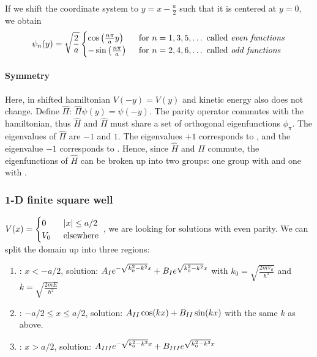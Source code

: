 If we shift the coordinate system to $y = x - \frac{a}{2}$ such that it is centered
at $y=0$, we obtain
\begin{align*}
    \psi_n (y) = \sqrt{\frac{2}{a}} \begin{cases}
        \cos \left(  \frac{n \pi}{a} y \right) \hspace{5pt} &\text{for } n=1,3,5,\dots \text{ called \textit{even functions}}
        \\
        - \sin \left( \frac{n \pi}{a} \right) \hspace{5pt} &\text{for } n=2,4,6,\dots \text{ called \textit{odd functions}}
    \end{cases} 
\end{align*}

\paragraph{Symmetry}
Here, in shifted hamiltonian $V(-y) = V(y)$ and kinetic energy also does not change.
Define  $\hat{\Pi}$: $\hat{\Pi} \psi(y) = \psi(-y)$. The
parity operator commutes with the hamiltonian, thus $\hat{H}$ and $\hat{\Pi}$
must share a set of orthogonal eigenfunctions $\phi_{\pi}$. The eigenvalues
of $\hat{\Pi}$ are $-1$ and $1$. The eigenvalues $+1$ corresponds to ,
and the eigenvalue $-1$ corresponds to . Hence, since $\hat{H}$
and $\Pi$ commute, the eigenfunctions of $\hat{H}$ can be broken up into two groups:
one group with  and one with .

\subsubsection{1-D finite square well}
$V(x) = \begin{cases}
    0 \hspace{5pt} &\left\vert x \right\vert \leq a/2
    \\
    V_0 \hspace{5pt} &\text{elsewhere}
\end{cases}$
, we are looking for solutions with even parity.
We can split the domain up into three regions:
\begin{enumerate}[]
    \item {}: $x < - a/2$, solution:
        $A_{\uproman{1}} e^{-\sqrt{k_0^2 - k^2} x} + B_{\uproman{1}} e^{\sqrt{k_0^2 - k^2} x}$
        with $k_0 = \sqrt{\frac{2 m V_0}{\hbar^2}}$ and $k = \sqrt{\frac{2 m E}{\hbar^2}}$
    \item {}: $-a/2 \leq x \leq a/2$, solution: $A_{\uproman{2}} \cos(k x) + B_{\uproman{2}} \sin(k x)$
        with the same $k$ as above.
    \item {}: $x > a/2$, solution: $A_{\uproman{3}} e^{-\sqrt{k_0^2 - k^2} x} + B_{\uproman{3}} e^{\sqrt{k_0^2 - k^2} x}$
\end{enumerate}

